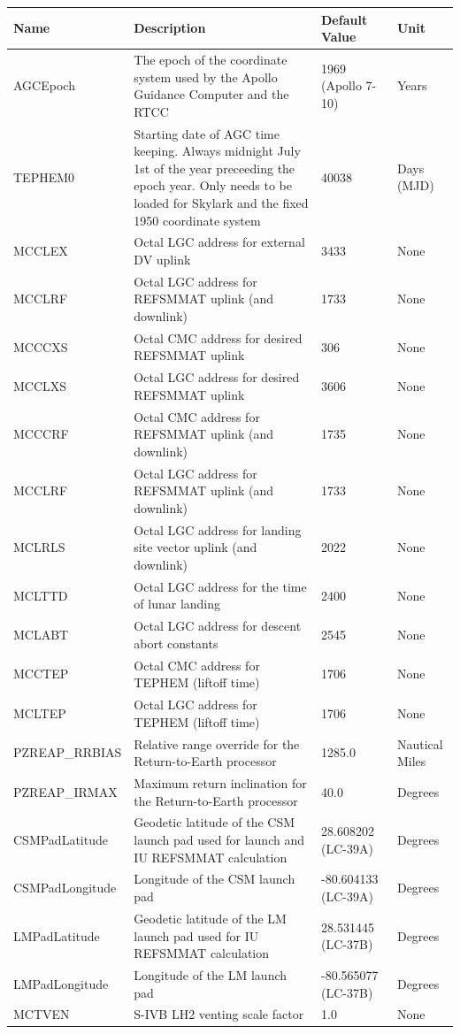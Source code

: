 \documentclass[11pt]{article} %
\begin{document}
\begin{tabular}{L{3cm} L{7.5cm} L{2cm} L{1.5cm}}
\hline
\textbf{Name} & \textbf{Description} & \textbf{Default Value} & \textbf{Unit}\\
\hline
AGCEpoch & The epoch of the coordinate system used by the Apollo Guidance Computer and the RTCC& 1969 (Apollo 7-10) & Years\\
\hline
TEPHEM0 & Starting date of AGC time keeping. Always midnight July 1st of the year preceeding the epoch year. Only needs to be loaded for Skylark and the fixed 1950 coordinate system & 40038 & Days (MJD)\\
\hline
MCCLEX & Octal LGC address for external DV uplink & 3433 & None\\
\hline
MCCLRF & Octal LGC address for REFSMMAT uplink (and downlink)& 1733 & None\\
\hline
MCCCXS & Octal CMC address for desired REFSMMAT uplink & 306 & None\\
\hline
MCCLXS & Octal LGC address for desired REFSMMAT uplink & 3606 & None\\
\hline
MCCCRF & Octal CMC address for REFSMMAT uplink (and downlink) & 1735 & None\\
\hline
MCCLRF & Octal LGC address for REFSMMAT uplink (and downlink) & 1733 & None\\
\hline
MCLRLS & Octal LGC address for landing site vector uplink (and downlink) & 2022 & None\\
\hline
MCLTTD & Octal LGC address for the time of lunar landing & 2400 & None\\
\hline
MCLABT & Octal LGC address for descent abort constants & 2545 & None\\
\hline
MCCTEP & Octal CMC address for TEPHEM (liftoff time) & 1706 & None\\
\hline
MCLTEP & Octal LGC address for TEPHEM (liftoff time) & 1706 & None\\
\hline
PZREAP\_RRBIAS & Relative range override for the Return-to-Earth processor & 1285.0 & Nautical Miles\\
\hline
PZREAP\_IRMAX & Maximum return inclination for the Return-to-Earth processor & 40.0 & Degrees\\
\hline
CSMPadLatitude & Geodetic latitude of the CSM launch pad used for launch and IU REFSMMAT calculation & 28.608202 (LC-39A) & Degrees\\
\hline
CSMPadLongitude & Longitude of the CSM launch pad & -80.604133 (LC-39A) & Degrees\\
\hline
LMPadLatitude & Geodetic latitude of the LM launch pad used for IU REFSMMAT calculation & 28.531445 (LC-37B) & Degrees\\
\hline
LMPadLongitude & Longitude of the LM launch pad & -80.565077 (LC-37B) & Degrees\\
\hline
MCTVEN & S-IVB LH2 venting scale factor & 1.0 & None\\
\hline
\end{tabular}
\end{document}

